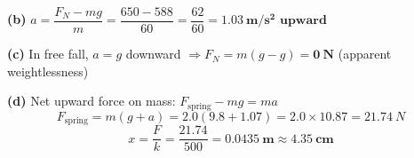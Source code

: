 \documentclass[addpoints]{exam}
\begin{document}
\begin{questions}
\begin{solution}[9cm]
\textbf{(b)} $a = \dfrac{F_N - mg}{m} = \dfrac{650 - 588}{60} = \dfrac{62}{60}
= \mathbf{\SI{1.03}{m/s^2} \text{ upward}}$

\textbf{(c)} In free fall, $a = g$ downward $\Rightarrow F_N = m(g - g) = \mathbf{\SI{0}{N}}$
(apparent weightlessness)

\textbf{(d)} Net upward force on mass: $F_\text{spring} - mg = ma$
\[
F_\text{spring} = m(g+a) = 2.0(9.8 + 1.07) = 2.0 \times 10.87 = \SI{21.74}{N}
\]
\[
x = \frac{F}{k} = \frac{21.74}{500} = \mathbf{\SI{0.0435}{m} \approx \SI{4.35}{cm}}
\]
\end{solution}

\end{questions}
\end{document}
